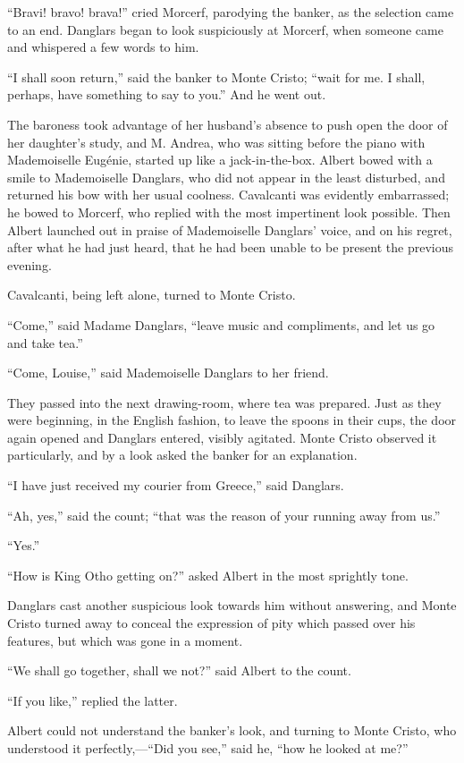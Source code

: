 “Bravi! bravo! brava!” cried Morcerf, parodying the banker, as the
selection came to an end. Danglars began to look suspiciously at
Morcerf, when someone came and whispered a few words to him.

“I shall soon return,” said the banker to Monte Cristo; “wait for me. I
shall, perhaps, have something to say to you.” And he went out.

The baroness took advantage of her husband’s absence to push open the
door of her daughter’s study, and M. Andrea, who was sitting before the
piano with Mademoiselle Eugénie, started up like a jack-in-the-box.
Albert bowed with a smile to Mademoiselle Danglars, who did not appear
in the least disturbed, and returned his bow with her usual coolness.
Cavalcanti was evidently embarrassed; he bowed to Morcerf, who replied
with the most impertinent look possible. Then Albert launched out in
praise of Mademoiselle Danglars’ voice, and on his regret, after what
he had just heard, that he had been unable to be present the previous
evening.

Cavalcanti, being left alone, turned to Monte Cristo.

“Come,” said Madame Danglars, “leave music and compliments, and let us
go and take tea.”

“Come, Louise,” said Mademoiselle Danglars to her friend.

They passed into the next drawing-room, where tea was prepared. Just as
they were beginning, in the English fashion, to leave the spoons in
their cups, the door again opened and Danglars entered, visibly
agitated. Monte Cristo observed it particularly, and by a look asked
the banker for an explanation.

“I have just received my courier from Greece,” said Danglars.

“Ah, yes,” said the count; “that was the reason of your running away
from us.”

“Yes.”

“How is King Otho getting on?” asked Albert in the most sprightly tone.

Danglars cast another suspicious look towards him without answering,
and Monte Cristo turned away to conceal the expression of pity which
passed over his features, but which was gone in a moment.

“We shall go together, shall we not?” said Albert to the count.

“If you like,” replied the latter.

Albert could not understand the banker’s look, and turning to Monte
Cristo, who understood it perfectly,—“Did you see,” said he, “how he
looked at me?”

